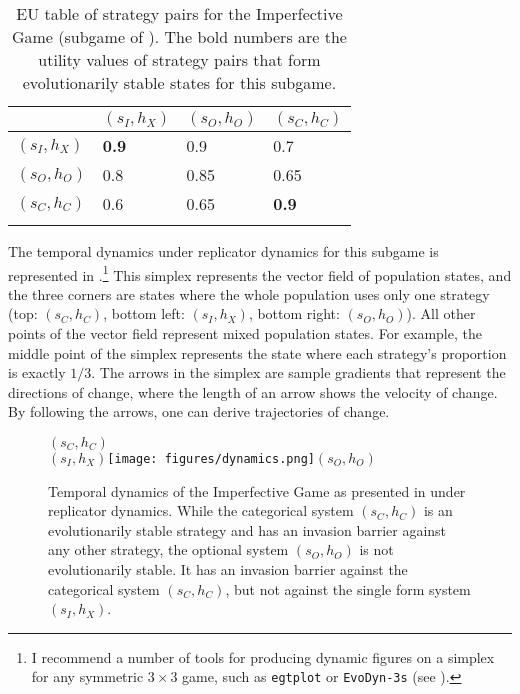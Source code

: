 \documentclass[output=paper,hidelinks]{langscibook}
\begin{document}
\begin{table}
\begin{tabular}{llll} 
\lsptoprule
    & \multicolumn{1}{c}{$(s_I, h_X)$} & \multicolumn{1}{c}{$(s_O, h_O)$} & \multicolumn{1}{c}{$(s_C, h_C)$}\\\midrule
$(s_I, h_X)$   & \textbf{0.9}  &  0.9  & 0.7 \\
$(s_O, h_O)$ & 0.8  &  0.85  & 0.65    \\
$(s_C, h_C)$ & 0.6  &  0.65  & \textbf{0.9}    \\
\lspbottomrule
\end{tabular}
\caption{EU table of strategy pairs for the Imperfective Game (subgame of ). The bold numbers are the utility values of strategy pairs that form evolutionarily stable states for this subgame.\label{EU_Imp_sub}}
\end{table}

The temporal dynamics under replicator dynamics for this subgame is represented in .\footnote{I recommend a number of tools for producing dynamic figures on a simplex for any symmetric $3 \times 3$ game, such as \texttt{egtplot} or \texttt{EvoDyn-3s} (see ).} This simplex represents the vector field of population states, and the three corners are states where the whole population uses only one strategy (top: $(s_C, h_C)$, bottom left: $(s_I, h_X)$, bottom right: $(s_O, h_O)$). All other points of the vector field represent mixed population states. For example, the middle point of the simplex represents the state where each strategy's proportion is exactly $1/3$. The arrows in the simplex are sample gradients that represent the directions of change, where the length of an arrow shows the velocity of change. By following the arrows, one can derive trajectories of change.

\begin{figure}
\centering
$(s_C, h_C)$\\$(s_I, h_X)$\texttt{[image: figures/dynamics.png]}$(s_O, h_O)$
\caption{Temporal dynamics of the Imperfective Game as presented in  under replicator dynamics.  While the categorical system $(s_C,h_C)$ is an evolutionarily stable strategy and has an  invasion barrier against any other strategy, %
the optional system $(s_O,h_O)$ is not evolutionarily stable. It has an invasion barrier against the categorical system $(s_C,h_C)$, but not against the single form system $(s_I,h_X)$.}
\label{dynamics}
\end{figure}
\end{document}
